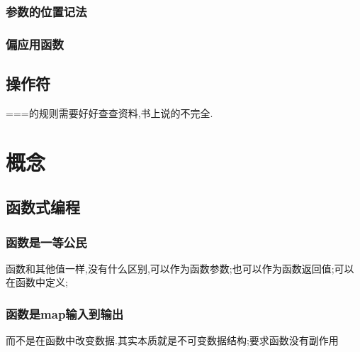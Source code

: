 \subsubsection{参数的位置记法}

\subsubsection{偏应用函数}

\subsection{操作符}

===的规则需要好好查查资料,书上说的不完全.



\section{概念}

\subsection{函数式编程}

\subsubsection{函数是一等公民}

函数和其他值一样,没有什么区别,可以作为函数参数;也可以作为函数返回值;可以在函数中定义;

\subsubsection{函数是map输入到输出}

而不是在函数中改变数据.其实本质就是不可变数据结构;要求函数没有副作用



